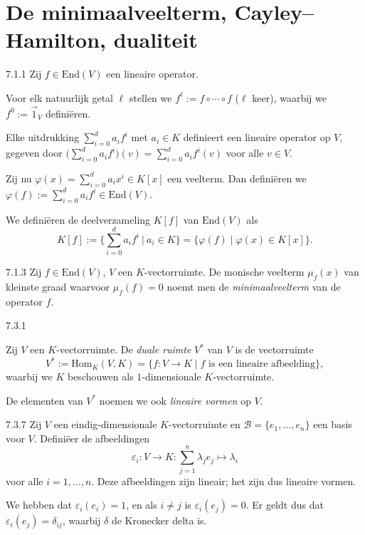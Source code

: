 \section{De minimaalveelterm, Cayley--Hamilton, dualiteit}

\begin{res}{7.1.1}
Zij $f\in\mathrm{End}(V)$ een lineaire operator.
\begin{myenum}
\item Voor elk natuurlijk getal $\ell$ stellen we $f^\ell:=f\circ\cdots\circ f$ ($\ell$ keer), waarbij we $f^0:=\vec 1_V$ defini\"eren.
\item Elke uitdrukking $\sum_{i=0}^d a_if^i$ met $a_i\in K$ definieert een lineaire operator op $V$, gegeven door $\big(\sum_{i=0}^d a_if^i\big)(v)=\sum_{i=0}^d a_if^i(v)$ voor alle $v\in V$.
\item Zij nu $\varphi(x)=\sum_{i=0}^d a_ix^i\in K[x]$ een veelterm. Dan defini\"eren we $\varphi(f):=\sum_{i=0}^d a_if^i\in\mathrm{End}(V)$.
\item We defini\"eren de deelverzameling $K[f]$ van $\mathrm{End}(V)$ als
\[
K[f]:=\Big\{\sum_{i=0}^d a_if^i \ \Big|\ a_i\in K\Big\}=\{\varphi(f)\mid \varphi(x)\in K[x]\}.
\]
\end{myenum}
\end{res}

\begin{res}{7.1.3}
Zij $f\in\mathrm{End}(V)$, $V$ een $K$-vectorruimte. De monische veelterm $\mu_f(x)$ van kleinste graad waarvoor $\mu_f(f)=0$ noemt men de \textit{minimaalveelterm} van de operator $f$.
\end{res}

\begin{res}{7.3.1}
\begin{myenum}
\item Zij $V$ een $K$-vectorruimte. De \textit{duale ruimte} $V^*$ van $V$ is de vectorruimte
\[
V^*:=\mathrm{Hom}_K(V,K)=\{f:V\to K \mid f \text{ is een lineaire afbeelding}\},
\]
waarbij we $K$ beschouwen als $1$-dimensionale $K$-vectorruimte.
\item De elementen van $V^*$ noemen we ook \textit{lineaire vormen} op $V$.
\end{myenum}
\end{res}

\begin{res}{7.3.7}
Zij $V$ een eindig-dimensionale $K$-vectorruimte en $\mathcal B=\{e_1,\dots,e_n\}$ een basis voor $V$. Defini\"eer de afbeeldingen
\[
\varepsilon_i:V\to K:\sum_{j=1}^n \lambda_je_j\mapsto \lambda_i
\]
voor alle $i=1,\dots,n$. Deze afbeeldingen zijn lineair; het zijn dus lineaire vormen.

We hebben dat $\varepsilon_i(e_i)=1$, en als $i\ne j$ is $\varepsilon_i(e_j)=0$. Er geldt dus dat $\varepsilon_i(e_j)=\delta_{ij}$, waarbij $\delta$ de Kronecker delta is.
\end{res}

